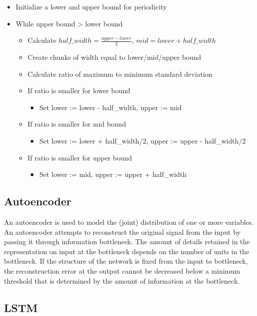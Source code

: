 \documentclass[%
aip,
amsmath,amssymb,
reprint,%
]{revtex4-1}
\begin{document}
\begin{itemize}
\item Initialize a lower and upper bound for periodicity
\item While upper bound > lower bound
\begin{itemize}
\item Calculate $half\_width = \frac{upper-lower}{2}$, $mid = lower + half\_width$
\item Create chunks of width equal to lower/mid/upper bound
\item Calculate ratio of maximum to minimum standard deviation
\item If ratio is smaller for lower bound
\begin{itemize}
\item Set lower := lower - half\_width, upper := mid
\end{itemize}
\item If ratio is smaller for mid bound
\begin{itemize}
\item Set lower := lower + half\_width/2, upper := upper - half\_width/2
\end{itemize}
\item If ratio is smaller for upper bound
\begin{itemize}
\item Set lower := mid, upper := upper + half\_width
\end{itemize}
\end{itemize}
\end{itemize}

\subsection{Autoencoder}

An autoencoder is used to model the (joint) distribution of one or more variables. An autoencoder attempts to reconstruct the original signal from the input by passing it through information bottleneck. The amount of details retained in the representation on input at the bottleneck depends on the number of units in the bottleneck. If the structure of the network is fixed from the input to bottleneck, the reconstruction error at the output cannot be decreased below a minimum threshold that is determined by the amount of information at the bottleneck.

\subsection{LSTM}
\end{document}
